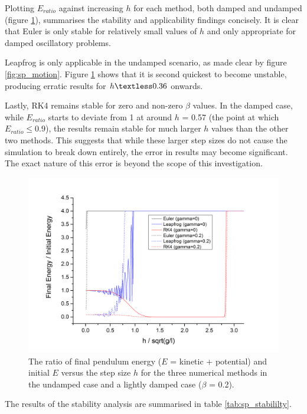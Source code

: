 \documentclass[11pt]{article}
\begin{document}
Plotting $E_{ratio}$ against increasing $h$ for each method, both damped and undamped (figure \ref{fig:e_vs_h}), summarises the stability and applicability findings concisely. It is clear that Euler is only stable for relatively small values of $h$ and only appropriate for damped oscillatory problems.

Leapfrog is only applicable in the undamped scenario, as made clear by figure \ref{fig:sp_motion}. Figure \ref{fig:e_vs_h} shows that it is second quickest to become unstable, producing erratic results for $h \textless 0.36$ onwards.

Lastly, RK4 remains stable for zero and non-zero $\beta$ values. In the damped case, while $E_{ratio}$ starts to deviate from 1 at around $h$ = 0.57 (the point at which $E_{ratio} \leq 0.9$), the results remain stable for much larger $h$ values than the other two methods. This suggests that while these larger step sizes do not cause the simulation to break down entirely, the error in results may become significant. The exact nature of this error is beyond the scope of this investigation.

\begin{figure}[h]
	\includegraphics[width=1.1\textwidth]{img/energy_ratio_vs_h.png}
	\caption{The ratio of final pendulum energy ($E$ = kinetic + potential) and initial $E$ versus the step size $h$ for the three numerical methods in the undamped case and a lightly damped case ($\beta$ = 0.2).}
	\label{fig:e_vs_h}
\end{figure}

The results of the stability analysis are summarised in table \ref{tab:sp_stabililty}.
\end{document}

